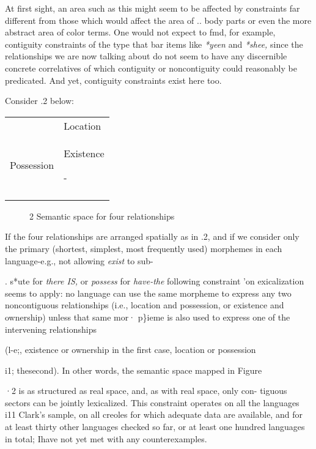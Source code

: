At first sight, an area such as this might seem to be affected by
constraints far different from those which would affect the area of ..
body parts or even the more abstract area of color terms. One would not expect to fmd, for example, contiguity constraints of the type that bar items like \textit{*yeen} and \textit{*shee,} since the relationships we are now talking about do not seem to have any discernible concrete correlatives of which contiguity or noncontiguity could reasonably be predicated. And yet, contiguity constraints exist here too.

Consider .2 below:

\begin{tabular}{ll}
\lsptoprule

\multicolumn{1}{l}{Ownership} & Location\\
Possession & Existence

 {}-\\
\lspbottomrule
\end{tabular}
\begin{figure}
\caption{2 Semantic space for four relationships}
\label{fig:4}
\end{figure}



If the four relationships are arranged spatially as in .2, and if we consider only the primary (shortest, simplest, most frequently used) morphemes in each language-e.g., not allowing \textit{exist }to sub-

. s*ute for \textit{there IS, }or \textit{possess }for \textit{have-the }following constraint 'on exicalization seems to apply: no language can use the same mor\-pheme to express any two noncontiguous relationships (i.e., location and possession, or existence and ownership) unless that same mor· p\}ieme is also used to express one of the intervening relationships

(l-e;, existence or ownership in the first case, location or possession

i1; thesecond). In other words, the semantic space mapped in Figure

·2 is as structured as real space, and, as with real space, only con- tiguous sectors can be jointly lexicalized. This constraint operates on all the languages i11 Clark's sample, on all creoles for which adequate
data are available, and for at least thirty other languages checked so far, or at least one hundred languages in total; Ihave not yet met with any counterexamples.

